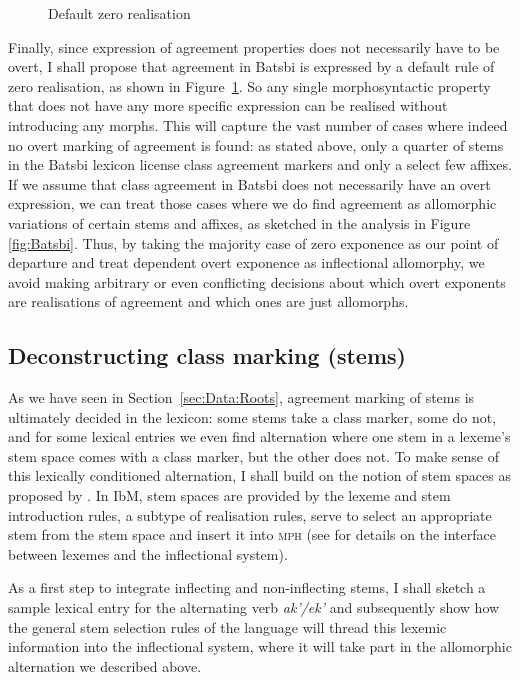 \documentclass[output=paper]{langsci/langscibook}
\begin{document}
\begin{figure}
  \caption{Default zero realisation\label{fig:IFD}}
\end{figure}

Finally, since expression of agreement properties does not necessarily
have to be overt, I shall propose that agreement in Batsbi is
expressed by a default rule of zero realisation, as shown in
Figure~\ref{fig:IFD}. So any single morphosyntactic property that
does not have any more specific expression can be realised without
introducing any morphs. This will capture the vast number of cases
where indeed no overt marking of agreement is found: as stated above,
only a quarter of stems in the Batsbi lexicon license class agreement
markers and only a select few affixes. If we assume that class
agreement in Batsbi does not necessarily have an overt expression, we
can treat those cases where we do find agreement as allomorphic
variations of certain stems and affixes, as sketched in the analysis
in Figure \ref{fig:Batsbi}. Thus, by taking the majority case of zero
exponence as our point of departure and treat dependent overt
exponence as inflectional allomorphy, we avoid making arbitrary or even
conflicting decisions about which overt exponents are realisations of
agreement and which ones are just allomorphs.

\subsection{Deconstructing class marking (stems)}

As we have seen in Section~\ref{sec:Data:Roots}, agreement marking of
stems is ultimately decided in the lexicon: some stems take a class
marker, some do not, and for some lexical entries we even find
alternation where one stem in a lexeme's stem space comes with a class
marker, but the other does not. To make sense of this lexically
conditioned alternation, I shall build on the notion of stem spaces as
proposed by \citet{Bonami06}.  In IbM, stem spaces are provided by the
lexeme and stem introduction rules, a subtype of realisation rules,
serve to select an appropriate stem from the stem space and insert it into
\textsc{mph} (see \citet{Bonami17b} for details on the interface
between lexemes and the inflectional system).

As a first step to integrate inflecting and non-inflecting stems, I
shall sketch a sample lexical entry for the alternating verb
\textit{ak'/ek'} and subsequently show how the general stem selection
rules of the language will thread this lexemic information into the
inflectional system, where it will take part in the allomorphic
alternation we described above.  
\end{document}
